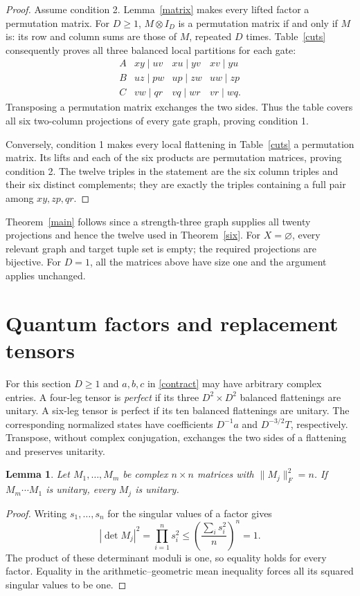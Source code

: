 \documentclass[11pt]{article}
\newtheorem{lemma}[theorem]{Lemma}
\begin{document}
\begin{proof}
Assume condition 2. Lemma~\ref{matrix} makes every lifted factor a
permutation matrix. For $D\ge1$, $M\otimes I_D$ is a permutation matrix
if and only if $M$ is: its row and column sums are those of $M$, repeated
$D$ times. Table~\ref{cuts} consequently proves all three balanced local
partitions for each gate:
\[
\begin{array}{c|ccc}
A&xy\mid uv&xu\mid yv&xv\mid yu\\
B&uz\mid pw&up\mid zw&uw\mid zp\\
C&vw\mid qr&vq\mid wr&vr\mid wq.
\end{array}
\]
Transposing a permutation matrix exchanges the two sides. Thus the table
covers all six two-column projections of every gate graph, proving
condition 1.

Conversely, condition 1 makes every local flattening in Table~\ref{cuts}
a permutation matrix. Its lifts and each of the six products are
permutation matrices, proving condition 2. The twelve triples in the
statement are the six column triples and their six distinct complements;
they are exactly the triples containing a full pair among $xy,zp,qr$.
\end{proof}

Theorem~\ref{main} follows since a strength-three graph supplies all
twenty projections and hence the twelve used in Theorem~\ref{six}.
For $X=\varnothing$, every relevant graph and target tuple set is empty;
the required projections are bijective. For $D=1$, all the matrices
above have size one and the argument applies unchanged.

\section{Quantum factors and replacement tensors}
For this section $D\ge1$ and $a,b,c$ in \eqref{contract} may have arbitrary
complex entries. A four-leg tensor is \emph{perfect} if its three
$D^2\times D^2$ balanced flattenings are unitary. A six-leg tensor is
perfect if its ten balanced flattenings are unitary. The corresponding
normalized states have coefficients $D^{-1}a$ and $D^{-3/2}T$,
respectively. Transpose, without complex conjugation, exchanges the two
sides of a flattening and preserves unitarity.

\begin{lemma}\label{normdet}
Let $M_1,\ldots,M_m$ be complex $n\times n$ matrices with
$\|M_j\|_F^2=n$. If $M_m\cdots M_1$ is unitary, every $M_j$ is unitary.
\end{lemma}
\begin{proof}
Writing $s_1,\ldots,s_n$ for the singular values of a factor gives
\[
 |\det M_j|^2=\prod_{i=1}^n s_i^2
 \le \left(\frac{\sum_i s_i^2}{n}\right)^n=1.
\]
The product of these determinant moduli is one, so equality holds for
every factor. Equality in the arithmetic--geometric mean inequality
forces all its squared singular values to be one.
\end{proof}
\end{document}
